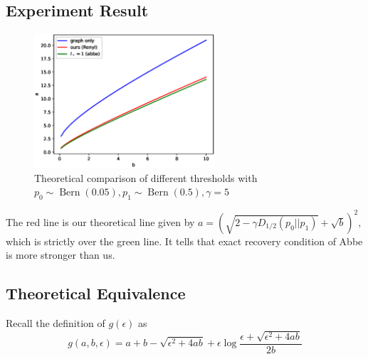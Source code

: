 \documentclass{article}
\DeclareMathOperator{\Bern}{Bern}
\begin{document}
\subsection{Experiment Result}
\begin{figure}
    \centering
    \includegraphics[width=0.6\textwidth]{comparison.eps}\caption{Theoretical comparison of different thresholds with $p_0 \sim \Bern(0.05), p_1\sim \Bern(0.5), \gamma=5$}
    \label{fig:my_label}
\end{figure}

The red line is our theoretical line
given by $a=(\sqrt{2 - \gamma D_{1/2}(p_0||p_1)} + \sqrt{b})^2$,
which is strictly over the green line. It tells that
exact recovery condition of Abbe is more stronger than us.
\subsection{Theoretical Equivalence}
Recall the definition of $g(\epsilon)$ as
	\begin{equation}\label{eq:gab}
	g(a,b,\epsilon) = a + b - \sqrt{\epsilon^2 + 4ab} + \epsilon \log \frac{\epsilon + \sqrt{\epsilon^2 + 4ab}}{2b}
	\end{equation}
	
\end{document}

